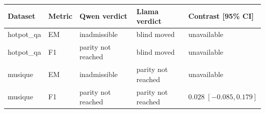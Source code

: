 \begin{tabular}{@{}lllll@{}}
\toprule
Dataset & Metric & Qwen verdict & Llama verdict & Contrast [95\% CI] \\
\midrule
hotpot\_qa & EM & inadmissible & blind moved & unavailable \\
hotpot\_qa & F1 & parity not reached & blind moved & unavailable \\
musique & EM & inadmissible & parity not reached & unavailable \\
musique & F1 & parity not reached & parity not reached & $0.028\;[-0.085, 0.179]$ \\
\bottomrule
\end{tabular}
